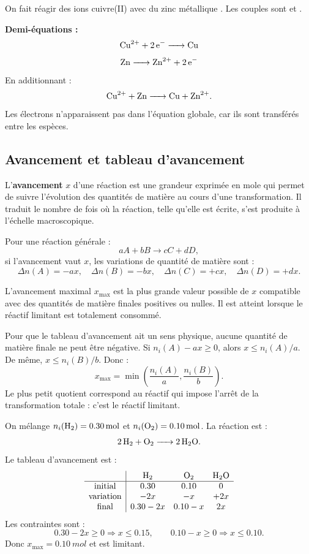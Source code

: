 \documentclass[11pt,a4paper]{article}
\newcommand{\xmax}{x_{\max}}
\begin{document}
\begin{exemplebox}
On fait réagir des ions cuivre(II)  avec du zinc métallique . Les couples sont  et .

\textbf{Demi-équations :}
\[
\ce{Cu^{2+} + 2e^- -> Cu}
\]
\[
\ce{Zn -> Zn^{2+} + 2e^-}
\]
En additionnant :
\[
\ce{Cu^{2+} + Zn -> Cu + Zn^{2+}}.
\]
Les électrons n'apparaissent pas dans l'équation globale, car ils sont transférés entre les espèces.
\end{exemplebox}

\subsection{Avancement et tableau d'avancement}

\begin{definitionbox}
L'\textbf{avancement} $x$ d'une réaction est une grandeur exprimée en mole qui permet de suivre l'évolution des quantités de matière au cours d'une transformation. Il traduit le nombre de fois où la réaction, telle qu'elle est écrite, s'est produite à l'échelle macroscopique.
\end{definitionbox}

\begin{methodbox}
Pour une réaction générale :
\[
aA+bB\rightarrow cC+dD,
\]
si l'avancement vaut $x$, les variations de quantité de matière sont :
\[
\Delta n(A)=-ax,\quad \Delta n(B)=-bx,\quad \Delta n(C)=+cx,\quad \Delta n(D)=+dx.
\]
\end{methodbox}

\begin{theorembox}
L'avancement maximal $\xmax$ est la plus grande valeur possible de $x$ compatible avec des quantités de matière finales positives ou nulles. Il est atteint lorsque le réactif limitant est totalement consommé.
\end{theorembox}

\begin{demobox}
Pour que le tableau d'avancement ait un sens physique, aucune quantité de matière finale ne peut être négative. Si $n_i(A)-ax\geq0$, alors $x\leq n_i(A)/a$. De même, $x\leq n_i(B)/b$. Donc :
\[
\xmax=\min\left(\frac{n_i(A)}{a},\frac{n_i(B)}{b}\right).
\]
Le plus petit quotient correspond au réactif qui impose l'arrêt de la transformation totale : c'est le réactif limitant.
\end{demobox}

\begin{exemplebox}
On mélange $n_i(\ce{H2})=\SI{0.30}{mol}$ et $n_i(\ce{O2})=\SI{0.10}{mol}$. La réaction est :
\[
\ce{2 H2 + O2 -> 2 H2O}.
\]
Le tableau d'avancement est :
\[
\begin{array}{c|ccc}
 & \ce{H2} & \ce{O2} & \ce{H2O} \\
\hline
\text{initial} & 0.30 & 0.10 & 0 \\
\text{variation} & -2x & -x & +2x \\
\text{final} & 0.30-2x & 0.10-x & 2x
\end{array}
\]
Les contraintes sont :
\[
0.30-2x\geq0 \Rightarrow x\leq0.15,\qquad 0.10-x\geq0 \Rightarrow x\leq0.10.
\]
Donc $\xmax=\SI{0.10}{mol}$ et  est limitant.
\end{exemplebox}
\end{document}
